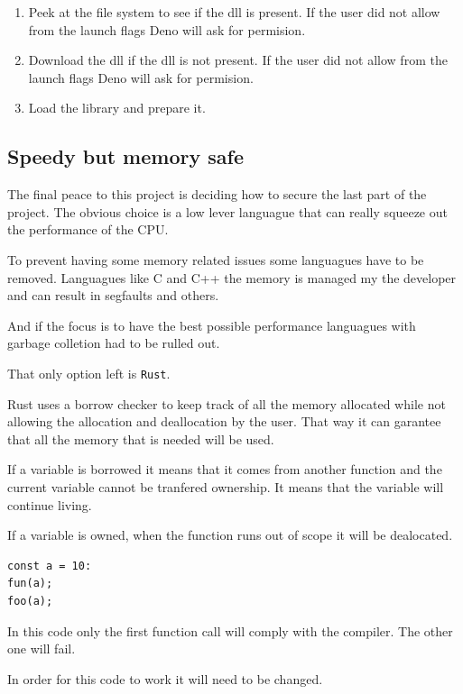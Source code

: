 \documentclass[12pt, letterpaper]{article}
\begin{document}
\begin{multicols}{2}
    \begin{enumerate}
        \item Peek at the file system to see if the dll is present. If the user did not allow from the launch flags Deno will ask for permision.
        \item Download the dll if the dll is not present. If the user did not allow from the launch flags Deno will ask for permision.
        \item Load the library and prepare it.
    \end{enumerate}

    \subsection{Speedy but memory safe}

    The final peace to this project is deciding how to secure the last part of the project. The obvious choice is a low lever languague that can really squeeze out the performance of the CPU.

    To prevent having some memory related issues some languagues have to be removed. Languagues like C and C++ the memory is managed my the developer and can result in segfaults and others.

    And if the focus is to have the best possible performance languagues with garbage colletion had to be rulled out.

    That only option left is \verb|Rust|.

    Rust uses a borrow checker to keep track of all the memory allocated while not allowing the allocation and deallocation by the user. That way it can garantee that all the memory that is needed will be used.

    If a variable is borrowed it means that it comes from another function and the current variable cannot be tranfered ownership. It means that the variable will continue living.

    If a variable is owned, when the function runs out of scope it will be dealocated.

    \begin{lstlisting}
const a = 10:
fun(a);
foo(a);
    \end{lstlisting}

    In this code only the first function call will comply with the compiler. The other one will fail.

    In order for this code to work it will need to be changed.


\end{multicols}
\end{document}
